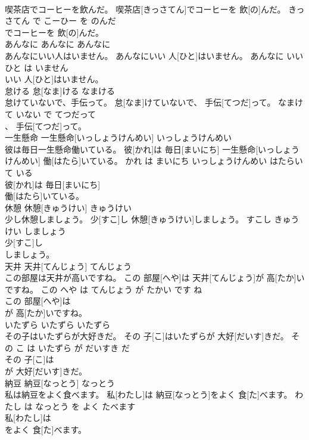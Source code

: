 \documentclass[8pt]{extreport}
\begin{document}
\begin{CJK}{UTF8}{min}
\\	喫茶店でコーヒーを飲んだ。	喫茶店[きっさてん]でコーヒーを 飲[の]んだ。	きっさてん で こーひー を のんだ	
\\	でコーヒーを 飲[の]んだ。			
\\	あんなに	あんなに	あんなに	
\\	あんなにいい人はいません。	あんなにいい 人[ひと]はいません。	あんなに いい ひと は いません	
\\	いい 人[ひと]はいません。			
\\	怠ける	怠[なま]ける	なまける	
\\	怠けていないで、手伝って。	怠[なま]けていないで、 手伝[てつだ]って。	なまけて いない で てつだって	
\\	、 手伝[てつだ]って。			
\\	一生懸命	一生懸命[いっしょうけんめい]	いっしょうけんめい	
\\	彼は毎日一生懸命働いている。	彼[かれ]は 毎日[まいにち] 一生懸命[いっしょうけんめい] 働[はたら]いている。	かれ は まいにち いっしょうけんめい はたらいて いる	
\\	彼[かれ]は 毎日[まいにち]
\\	働[はたら]いている。			
\\	休憩	休憩[きゅうけい]	きゅうけい	
\\	少し休憩しましょう。	少[すこ]し 休憩[きゅうけい]しましょう。	すこし きゅうけい しましょう	
\\	少[すこ]し
\\	しましょう。			
\\	天井	天井[てんじょう]	てんじょう	
\\	この部屋は天井が高いですね。	この 部屋[へや]は 天井[てんじょう]が 高[たか]いですね。	この へや は てんじょう が たかい です ね	
\\	この 部屋[へや]は
\\	が 高[たか]いですね。			
\\	いたずら	いたずら	いたずら	
\\	その子はいたずらが大好きだ。	その 子[こ]はいたずらが 大好[だいす]きだ。	その こ は いたずら が だいすき だ	
\\	その 子[こ]は
\\	が 大好[だいす]きだ。			
\\	納豆	納豆[なっとう]	なっとう	
\\	私は納豆をよく食べます。	私[わたし]は 納豆[なっとう]をよく 食[た]べます。	わたし は なっとう を よく たべます	
\\	私[わたし]は
\\	をよく 食[た]べます。			

\end{CJK}
\end{document}
